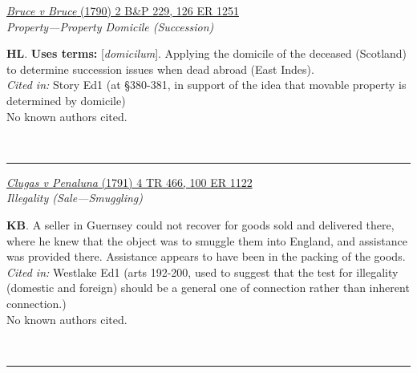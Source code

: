 \documentclass[twoside]{article}
\begin{document}
        \begin{small}
        \begin{center}
        \href{https://heinonline.org/HOL/P?h=hein.engrep/engrg0126&i=1255}{\textit{Bruce v Bruce} (1790) 2 B\&P 229, 126 ER 1251} \label{120} \\ 
\textit{Property---Property Domicile (Succession)}\\
        \end{center}
        \textbf{HL}.  \textbf{Uses terms: }[\textit{domicilum}]. Applying the domicile of the deceased (Scotland) to determine succession issues when dead abroad (East Indes).\\\textit{Cited in: }Story Ed1 (at §380-381, in support of the idea that movable property is determined by domicile)\\No known authors cited.
        \end{small}\\
        \rule{\textwidth}{0.5pt}
        

        \begin{small}
        \begin{center}
        \href{https://heinonline.org/HOL/P?h=hein.engrep/engrf0100&i=1126}{\textit{Clugas v Penaluna} (1791) 4 TR 466, 100 ER 1122} \label{69} \\ 
\textit{Illegality (Sale---Smuggling)}\\
        \end{center}
        \textbf{KB}. A seller in Guernsey could not recover for goods sold and delivered there, where he knew that the object was to smuggle them into England, and assistance was provided there. Assistance appears to have been in the packing of the goods.\\\textit{Cited in: }Westlake Ed1 (arts 192-200, used to suggest that the test for illegality (domestic and foreign) should be a general one of connection rather than inherent connection.)\\No known authors cited.
        \end{small}\\
        \rule{\textwidth}{0.5pt}
        
\end{document}
